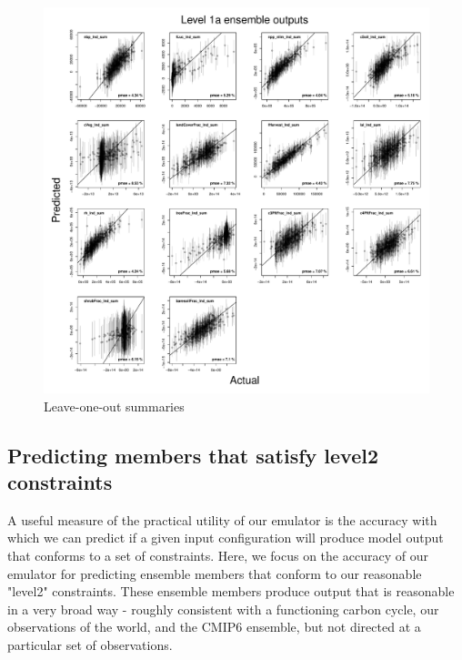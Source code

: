 \documentclass[gmd, manuscript]{copernicus}
\begin{document}
%
\begin{figure}[t]
\includegraphics[width=12cm]{./graphics/kmloostats_YAnom_level1a.pdf}
\caption{Leave-one-out summaries }
\label{fig:kmloostats_YAnom_level1a}
\end{figure}

\subsection{Predicting members that satisfy level2 constraints} 

A useful measure of the practical utility of our emulator is the accuracy with which we can predict if a given input configuration will produce model output that conforms to a set of constraints. Here, we focus on the accuracy of our emulator for predicting ensemble members that conform to our reasonable "level2" constraints. These ensemble members produce output that is reasonable in a very broad way - roughly consistent with a functioning carbon cycle, our observations of the world, and the CMIP6 ensemble, but not directed at a particular set of observations.
\end{document}
